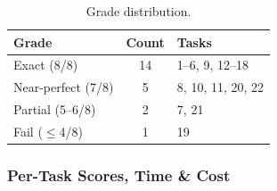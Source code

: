 \begin{table}[h]
\centering
\caption{Grade distribution.}\label{tab:grade-raw}
\begin{tabular}{lcl}
\toprule
\textbf{Grade} & \textbf{Count} & \textbf{Tasks} \\
\midrule
Exact (8/8)        & 14 & 1--6, 9, 12--18 \\
Near-perfect (7/8) &  5 & 8, 10, 11, 20, 22 \\
Partial (5--6/8)   &  2 & 7, 21 \\
Fail ($\le$4/8)    &  1 & 19 \\
\bottomrule
\end{tabular}
\end{table}

\subsubsection{Per-Task Scores, Time \& Cost}

